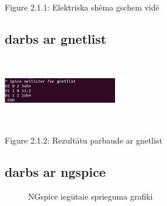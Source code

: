 \documentclass{report}
\begin{document}
            \caption{Figure 2.1.1: Elektriska shēma gschem vidē}
\subsection{darbs ar gnetlist}

\includegraphics[width=5cm, height=3cm]{c.png}
\caption{Figure 2.1.2: Rezultātu parbaude ar gnetlist}

\subsection{darbs ar ngspice}
\begin{figure}[h]
        \centering
        \label{fig:my_label2}
    \end{figure}
    \begin{figure}[h]
         \centering
        \caption{NGspice iegūtaie sprieguma grafiki}
        \label{fig:my_label3}
\end{figure}
\end{document}
